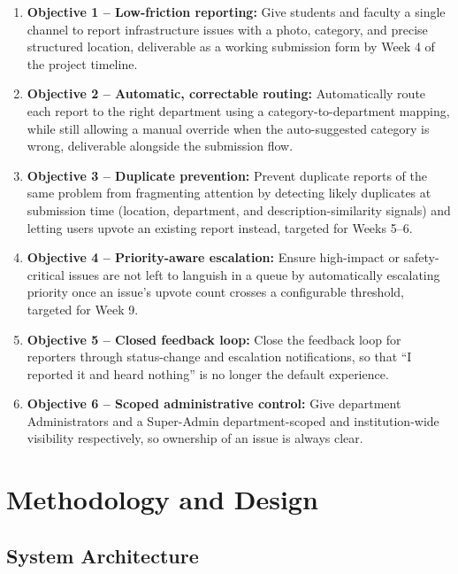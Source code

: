 \documentclass[11pt]{report}
\begin{document}
\begin{enumerate}
  \item \textbf{Objective 1 -- Low-friction reporting:} Give students
    and faculty a single channel to report infrastructure issues with a
    photo, category, and precise structured location, deliverable as a
    working submission form by Week 4 of the project timeline.
  \item \textbf{Objective 2 -- Automatic, correctable routing:}
    Automatically route each report to the right department using a
    category-to-department mapping, while still allowing a manual
    override when the auto-suggested category is wrong, deliverable
    alongside the submission flow.
  \item \textbf{Objective 3 -- Duplicate prevention:} Prevent duplicate
    reports of the same problem from fragmenting attention by detecting
    likely duplicates at submission time (location, department, and
    description-similarity signals) and letting users upvote an
    existing report instead, targeted for Weeks 5--6.
  \item \textbf{Objective 4 -- Priority-aware escalation:} Ensure
    high-impact or safety-critical issues are not left to languish in a
    queue by automatically escalating priority once an issue's upvote
    count crosses a configurable threshold, targeted for Week 9.
  \item \textbf{Objective 5 -- Closed feedback loop:} Close the feedback
    loop for reporters through status-change and escalation
    notifications, so that ``I reported it and heard nothing'' is no
    longer the default experience.
  \item \textbf{Objective 6 -- Scoped administrative control:} Give
    department Administrators and a Super-Admin department-scoped and
    institution-wide visibility respectively, so ownership of an issue
    is always clear.
\end{enumerate}

\chapter{Methodology and Design}

\section{System Architecture}
\end{document}
